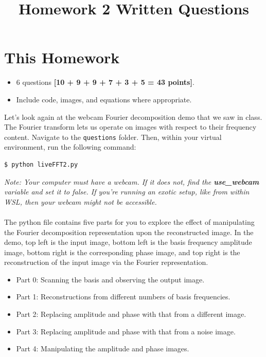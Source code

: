 \documentclass{csci1430}
\begin{document}
\title{Homework 2 Written Questions}
\maketitle
\thispagestyle{fancy}

\writeinstructions

\section*{This Homework}
\begin{itemize}
    \item 6 questions \textbf{[10 + 9 + 9 + 7 + 3 + 5 = 43 points]}.
    \item Include code, images, and equations where appropriate.
\end{itemize}

\pagebreak


\begin{question}[points=10] 
Let's look again at the webcam Fourier decomposition demo that we saw in class. The Fourier transform lets us operate on images with respect to their frequency content. Navigate to the \texttt{questions} folder. Then, within your virtual environment, run the following command:
\begin{verbatim}
$ python liveFFT2.py
\end{verbatim}
\end{question}

\emph{Note: Your computer must have a webcam. If it does not, find the \textbf{use\_webcam} variable and set it to false. If you're running an exotic setup, like from within WSL, then your webcam might not be accessible.}
\\
\\
The python file contains five parts for you to explore the effect of manipulating the Fourier decomposition representation upon the reconstructed image. In the demo, top left is the input image, bottom left is the basis frequency amplitude image, bottom right is the corresponding phase image, and top right is the reconstruction of the input image via the Fourier representation.

\begin{itemize}
    \item Part 0: Scanning the basis and observing the output image.
    \item Part 1: Reconstructions from different numbers of basis frequencies.
    \item Part 2: Replacing amplitude and phase with that from a different image.
    \item Part 3: Replacing amplitude and phase with that from a noise image.
    \item Part 4: Manipulating the amplitude and phase images.
\end{itemize}
\end{document}
